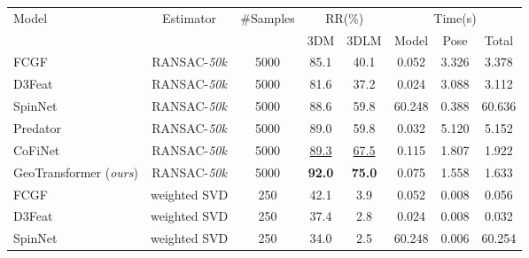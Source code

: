 \begin{table}[!t]
  \scriptsize
  \setlength{\tabcolsep}{1pt}
  \centering
  \begin{tabular}{l|c|c|cc|ccc}
  \toprule
  \multirow{2}{*}{Model} & \multirow{2}{*}{Estimator} & \multirow{2}{*}{\#Samples} & \multicolumn{2}{c|}{RR(\%)} & \multicolumn{3}{c}{Time(s)} \\
   & & & 3DM & 3DLM & Model & Pose & Total\\
  \midrule
  FCGF~\cite{choy2019fully} & RANSAC-\emph{50k} & 5000 & 85.1 & 40.1 & 0.052 & 3.326 & 3.378 \\
  D3Feat~\cite{bai2020d3feat} & RANSAC-\emph{50k} & 5000 & 81.6 & 37.2 & 0.024 & 3.088 & 3.112 \\
  SpinNet~\cite{ao2021spinnet} & RANSAC-\emph{50k} & 5000 & 88.6 & 59.8 & 60.248 & 0.388 & 60.636 \\
  Predator~\cite{huang2021predator} & RANSAC-\emph{50k} & 5000 & 89.0 & 59.8 & 0.032 & 5.120 & 5.152 \\
  CoFiNet~\cite{yu2021cofinet} & RANSAC-\emph{50k} & 5000 & \underline{89.3} & \underline{67.5} & 0.115 & 1.807 & 1.922 \\
  GeoTransformer (\emph{ours}) & RANSAC-\emph{50k} & 5000 & \textbf{92.0} & \textbf{75.0} & 0.075 & 1.558 & 1.633 \\
  \midrule
  FCGF~\cite{choy2019fully} & weighted SVD & 250 & 42.1 & 3.9 & 0.052 & 0.008 & 0.056 \\  %
  D3Feat~\cite{bai2020d3feat} & weighted SVD & 250 & 37.4 & 2.8 & 0.024 & 0.008 & 0.032 \\  %
  SpinNet~\cite{ao2021spinnet} & weighted SVD & 250 & 34.0 & 2.5 & 60.248 & 0.006 & 60.254 \\  %

\end{tabular}
\end{table}
